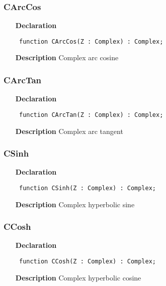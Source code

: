 \documentclass[12pt,a4paper,oneside]{report}
\newcommand{\declarationitem}[1]{\textbf{#1}}
\newcommand{\descriptiontitle}[1]{\textbf{#1}}
\newcommand{\code}[1]{\texttt{#1}}
\begin{document}
\subsubsection{CArcCos}
\label{ucomplex-CArcCos}
\begin{itemize}\item[\declarationitem{Declaration}\hfill]
\begin{flushleft}
\code{
function CArcCos(Z : Complex) : Complex;}

\end{flushleft}

\par
\item[\descriptiontitle{Description}]
Complex arc cosine

\end{itemize}
\subsubsection{CArcTan}
\label{ucomplex-CArcTan}
\begin{itemize}\item[\declarationitem{Declaration}\hfill]
\begin{flushleft}
\code{
function CArcTan(Z : Complex) : Complex;}

\end{flushleft}

\par
\item[\descriptiontitle{Description}]
Complex arc tangent

\end{itemize}
\subsubsection{CSinh}
\label{ucomplex-CSinh}
\begin{itemize}\item[\declarationitem{Declaration}\hfill]
\begin{flushleft}
\code{
function CSinh(Z : Complex) : Complex;}

\end{flushleft}

\par
\item[\descriptiontitle{Description}]
Complex hyperbolic sine

\end{itemize}
\subsubsection{CCosh}
\label{ucomplex-CCosh}
\begin{itemize}\item[\declarationitem{Declaration}\hfill]
\begin{flushleft}
\code{
function CCosh(Z : Complex) : Complex;}

\end{flushleft}

\par
\item[\descriptiontitle{Description}]
Complex hyperbolic cosine

\end{itemize}
\end{document}
